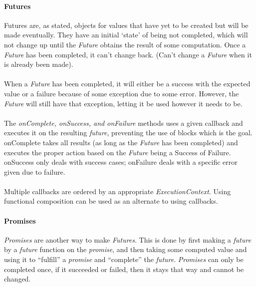\documentclass[12pt]{article}
\begin{document}
		\paragraph{Futures}Futures are, as stated, objects for values that have yet to be created but will be made eventually.  They have an initial ‘state’ of being not completed, which will not change up until the \textit{Future} obtains the result of some computation.  Once a \textit{Future} has been completed, it can’t change back.  (Can’t change a \textit{Future} when it is already been made).
		\paragraph{}When a \textit{Future} has been completed, it will either be a success with the expected value or a failure because of some exception due to some error. However, the \textit{Future} will still have that exception, letting it be used however it needs to be.
		\paragraph{}The \textit{onComplete, onSuccess, and onFailure} methods uses a given callback and executes it on the resulting \textit{future}, preventing the use of blocks which is the goal.  onComplete takes all results (as long as the \textit{Future} has been completed) and executes the proper action based on the \textit{Future} being a Success of Failure.  onSuccess only deals with success cases; onFailure deals with a specific error given due to failure.
		\paragraph{}Multiple callbacks are ordered by an appropriate \textit{ExecutionContext}.  Using functional composition can be used as an alternate to using callbacks.
		\paragraph{Promises}\textit{Promises} are another way to make \textit{Futures}.  This is done by first making a \textit{future} by a \textit{future} function on the \textit{promise}, and then taking some computed value and using it to “fulfill” a \textit{promise} and “complete” the \textit{future}.  \textit{Promises} can only be completed once, if it succeeded or failed, then it stays that way and cannot be changed.

\end{document}
